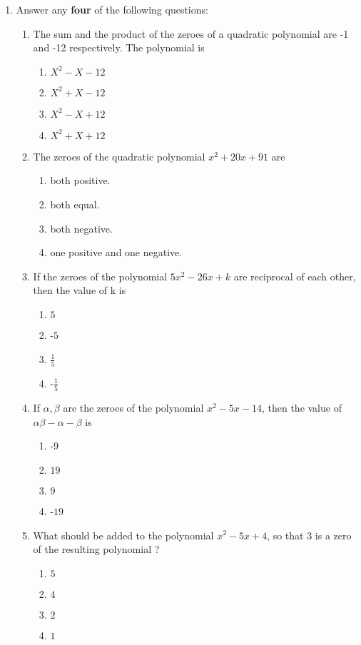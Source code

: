 \documentclass[20pt,-letter paper]{article}
\begin{document}
\begin{enumerate}
\item Answer any \textbf{four} of the following questions:
\begin{enumerate}  
\item The sum and the product of the zeroes of a quadratic polynomial are -1 and -12 respectively. The polynomial is 
\begin{enumerate}  
\item $X^2-X-12$
\item $X^2+X-12$
\item $X^2-X+12$
\item $X^2+X+12$
\end{enumerate}  
\item The zeroes of the quadratic polynomial $x^2+20x+91$ are
\begin{enumerate}  
\item both positive.
\item both equal.
\item both negative.
\item one positive and one negative.  
\end{enumerate}  
\item  If the zeroes of the polynomial $5x^2-26x+k$ are reciprocal of each other, then the value of k is 
\begin{enumerate}  
\item  $5$
\item -$5$
\item  $\frac{1}{5}$
\item -$\frac{1}{5}$
\end{enumerate}  
\item   If $\alpha,\beta$ are the zeroes of the polynomial $x^2-5x-14$, then the value of $\alpha\beta-\alpha-\beta$ is
\begin{enumerate}  
\item -$9$
\item  $19$
\item  $9$
\item -$19$
\end{enumerate}  
\item What should be added to the polynomial $x^2-5x+4$, so that $3$ is a zero of the resulting polynomial ? 
\begin{enumerate}  
\item $5$
\item $4$
\item $2$
\item $1$
\end{enumerate} 
\end{enumerate}


\end{enumerate}
\end{document}
